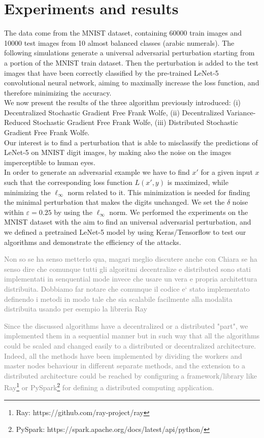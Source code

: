 \section{Experiments and results}
The data come from the MNIST dataset, containing 60000 train images and 10000 test images from 10 almost balanced classes (arabic numerals). The following simulations generate a universal adversarial perturbation starting from a portion of the MNIST train dataset. Then the perturbation is added to the test images that have been correctly classified by the pre-trained LeNet-5 convolutional neural network, aiming to maximally increase the loss function, and therefore minimizing the accuracy.\\
We now present the results of the three algorithm previously introduced: (i) Decentralized Stochastic Gradient Free Frank Wolfe, (ii) Decentralized Variance-Reduced Stochastic Gradient Free Frank Wolfe, (iii) Distributed Stochastic Gradient Free Frank Wolfe.\\
Our interest is to find a perturbation that is able to misclassify the predictions of LeNet-5 on MNIST digit images, by making also the noise on the images imperceptible to human eyes.\\ In order to generate an adversarial example we have to find $x'$ for a given input $x$ such that the corresponding loss function $L(x',y)$ is maximized, while minimizing the $\ell_{\infty}$ norm related to it. This minimization is needed for finding  the minimal perturbation that makes the digits unchanged. We set the $\delta$ noise within $\varepsilon=0.25$ by using the $\ell_{\infty}$ norm. We performed the experiments on the MNIST dataset with the aim to find an universal adversarial perturbation, and we defined a pretrained LeNet-5 model by using Keras/Tensorflow to test our algorithms and demonstrate the efficiency of the attacks.

\textcolor{gray}{Non so se ha senso metterlo qua, magari meglio discutere anche con Chiara se ha senso dire che comunque tutti gli algoritmi decentralize e distributed sono stati implementati in senquential mode invece che usare un vera e propria architettura distribuita. Dobbiamo far notare che comunque il codice e` stato implementato definendo i metodi in modo tale che sia scalabile facilmente alla modalita distribuita usando per esempio la libreria Ray}

\textcolor{gray}{Since the discussed algorithms have a decentralized or a distributed "part", we implemented them in a sequential manner but in such way that all the algorithms could be scaled and changed easily to a distributed or decentralized architecture. Indeed, all the methods have been implemented by dividing the workers and master nodes behaviour in different separate methods, and the extension to a distributed architecture could be reached by configuring a framework/library like Ray\footnote{Ray: https://github.com/ray-project/ray} or PySpark\footnote{PySpark: https://spark.apache.org/docs/latest/api/python/} for defining a distributed computing application.}

